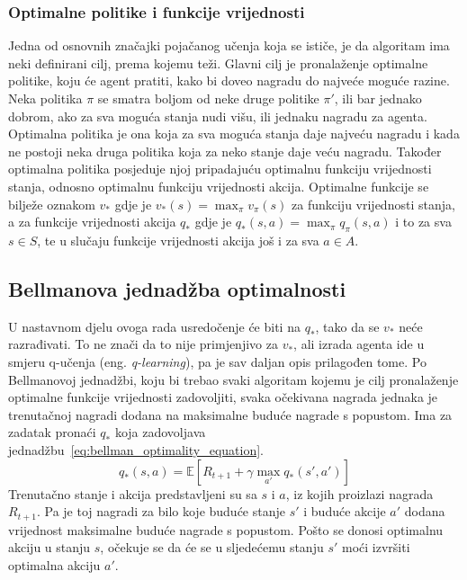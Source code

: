 \subsubsection{Optimalne politike i funkcije vrijednosti}
Jedna od osnovnih značajki pojačanog učenja koja se ističe, je da algoritam ima neki definirani cilj, prema kojemu teži. Glavni cilj je pronalaženje optimalne politike, koju će agent pratiti, kako bi doveo nagradu do najveće moguće razine. Neka politika $\pi$ se smatra boljom od neke druge politike $\pi'$, ili bar jednako dobrom, ako za sva moguća stanja nudi višu, ili jednaku nagradu za agenta. Optimalna politika je ona koja za sva moguća stanja daje najveću nagradu i kada ne postoji neka druga politika koja za neko stanje daje veću nagradu. Također optimalna politika posjeduje njoj pripadajuću optimalnu funkciju vrijednosti stanja, odnosno optimalnu funkciju vrijednosti akcija. Optimalne funkcije se bilježe oznakom $v_*$ gdje je $v_*(s) = \max_\pi v_\pi(s)$ za funkciju vrijednosti stanja, a za funkcije vrijednosti akcija $q_*$ gdje je $q_*(s, a) = \max_\pi q_\pi(s, a)$ i to za sva $s \in S$, te u slučaju funkcije vrijednosti akcija još i za sva $a \in A$.

\subsection{Bellmanova jednadžba optimalnosti}
U nastavnom djelu ovoga rada usredočenje će biti na $q_*$, tako da se $v_*$ neće razrađivati. To ne znači da to nije primjenjivo za $v_*$, ali izrada agenta ide u smjeru q-učenja (eng. \textit{q-learning}), pa je sav daljan opis prilagođen tome. 
Po Bellmanovoj jednadžbi, koju bi trebao svaki algoritam kojemu je cilj pronalaženje optimalne funkcije vrijednosti zadovoljiti, svaka očekivana nagrada jednaka je trenutačnoj nagradi dodana na maksimalne buduće nagrade s popustom. Ima za zadatak pronaći $q_*$ koja zadovoljava jednadžbu~\ref{eq:bellman_optimality_equation}.
\begin{equation}\label{eq:bellman_optimality_equation}
q_*(s, a) = \mathbb{E}\left[R_{t+1} + \gamma\max_{a'}q_*(s', a')\right]
\end{equation}
Trenutačno stanje i akcija predstavljeni su sa $s$ i $a$, iz kojih proizlazi nagrada $R_{t+1}$. Pa je toj nagradi za bilo koje buduće stanje $s'$ i buduće akcije $a'$ dodana vrijednost maksimalne buduće nagrade s popustom. Pošto se donosi optimalnu akciju u stanju $s$, očekuje se da će se u sljedećemu stanju $s'$ moći izvršiti optimalna akciju $a'$.

